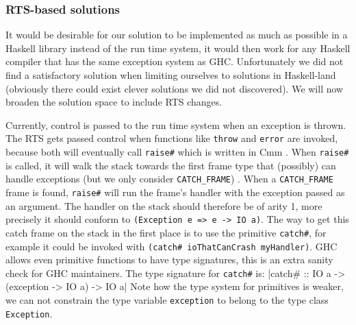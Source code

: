 \subsubsection{RTS-based solutions}

It would be desirable for our solution to be implemented as much
as possible in a Haskell library instead of the run time system, it
would then work for any Haskell compiler that has the same exception system as GHC.
Unfortunately we did not find a satisfactory solution when limiting
ourselves to solutions in Haskell-land (obviously there could exist clever
solutions we did not discovered). We will now broaden the solution
space to include RTS changes.



Currently, control is passed to the run time system when an
exception is thrown. The RTS gets passed control when functions like
\texttt{throw} \cite{hackage_base_control_exception_throw} and \texttt{error}
are invoked, because both will eventually call \texttt{raise\#} which is
written in Cmm \cite{github_raisezh}. When \texttt{raise\#} is called, it
will walk the stack towards the first frame type that (possibly) can
handle exceptions (but we only consider \texttt{CATCH\_FRAME})
\cite{github_raisezh_calls_helper, github_raiseExceptionHelter}.
When a \texttt{CATCH\_FRAME} frame is found, \texttt{raise\#} will
run the frame's handler with the exception passed as an argument. The
handler on the stack should therefore be of arity 1, more precisely
it should conform to \texttt{(Exception e => e -> IO a)}. The way to get
this catch frame on the stack in the first place is to use the primitive
\texttt{catch\#}, for example it could be invoked with \texttt{(catch\#
  ioThatCanCrash myHandler)}. GHC allows even primitive functions to
have type signatures, this is an extra sanity check for GHC maintainers.
The type signature for \texttt{catch\#} is:
|catch# :: IO a -> (exception -> IO a) -> IO a|
Note how the type system for primitives is weaker, we can not constrain
the type variable \texttt{exception} to belong to the type class \texttt{Exception}.


